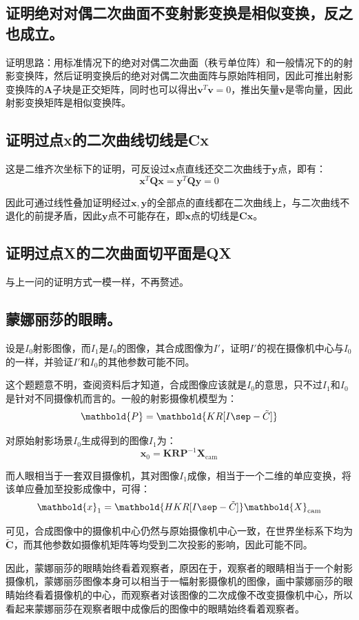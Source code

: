 \documentclass[11pt]{article}
\begin{document}
\subsection{证明绝对对偶二次曲面不变射影变换是相似变换，反之也成立。}
证明思路：用标准情况下的绝对对偶二次曲面（秩亏单位阵）和一般情况下的的射影变换阵，然后证明变换后的绝对对偶二次曲面阵与原始阵相同，因此可推出射影变换阵的$\mathbf{A}$子块是正交矩阵，同时也可以得出$\mathbf{v}^T\mathbf{v}=0$，推出矢量$\mathbf{v}$是零向量，因此射影变换矩阵是相似变换阵。
\subsection{证明过点x的二次曲线切线是Cx}
这是二维齐次坐标下的证明，可反设过$\mathbf{x}$点直线还交二次曲线于$\mathbf{y}$点，即有：
\begin{equation*}
  \mathbf{x}^T\mathbf{Qx}=\mathbf{y}^T\mathbf{Qy}=0
\end{equation*}\par
因此可通过线性叠加证明经过$\mathbf{x,y}$的全部点的直线都在二次曲线上，与二次曲线不退化的前提矛盾，因此$\mathbf{y}$点不可能存在，即$\mathbf{x}$点的切线是$\mathbf{Cx}$。
\subsection{证明过点X的二次曲面切平面是QX}
与上一问的证明方式一模一样，不再赘述。
\subsection{蒙娜丽莎的眼睛。}
{\heiti 设是$I_0$射影图像，而$I_1$是$I_0$的图像，其合成图像为$I'$，证明$I'$的视在摄像机中心与$I_0$的一样，并验证$I'$和$I_0$的其他参数可能不同。}\par
这个题题意不明，查阅资料\cite{MultipleViewGeometry}后才知道，合成图像应该就是$I_0$的意思，只不过$I_1$和$I_0$是针对不同摄像机而言的。一般的射影摄像机模型为：
\begin{equation*}
  \mathbold{P}=\mathbold{KR[I\sep -\tilde{C}]}
\end{equation*}\par
对原始射影场景$I_0$生成得到的图像$I_1$为：
\begin{equation*}
  \mathbold{x}_0=\mathbold{KRP}^{-1}\mathbold{X}_\mathrm{cam}
\end{equation*}\par
而人眼相当于一套双目摄像机，其对图像$I_1$成像，相当于一个二维的单应变换，将该单应叠加至投影成像中，可得：
\begin{equation*}
  \mathbold{x}_1=\mathbold{HKR[I\sep -\tilde{C}]}\mathbold{X}_\mathrm{cam}
\end{equation*}\par
可见，合成图像中的摄像机中心仍然与原始摄像机中心一致，在世界坐标系下均为$\tilde{\mathbf{C}}$，而其他参数如摄像机矩阵等均受到二次投影的影响，因此可能不同。\par
因此，蒙娜丽莎的眼睛始终看着观察者，原因在于，观察者的眼睛相当于一个射影摄像机，蒙娜丽莎图像本身可以相当于一幅射影摄像机的图像，画中蒙娜丽莎的眼睛始终看着摄像机的中心，而观察者对该图像的二次成像不改变摄像机中心，所以看起来蒙娜丽莎在观察者眼中成像后的图像中的眼睛始终看着观察者。
\end{document}
